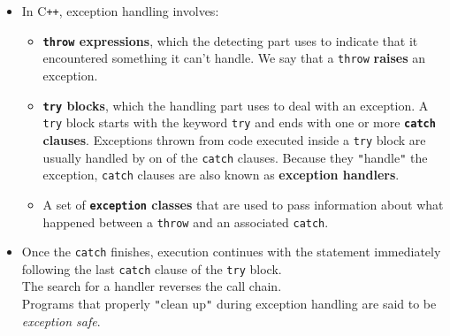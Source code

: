 \begin{itemize}
\item
In C\texttt{++}, exception handling involves:
\begin{itemize}
\item \textbf{\texttt{throw} expressions}, which the detecting part uses to indicate that it encountered something it can't handle. We say that a \texttt{throw} \textbf{raises} an exception.
\item \textbf{\texttt{try} blocks}, which the handling part uses to deal with an exception. A \texttt{try} block starts with the keyword \texttt{try} and ends with one or more \textbf{\texttt{catch} clauses}. Exceptions thrown from code executed inside a \texttt{try} block are usually handled by on of the \texttt{catch} clauses. Because they \texttt{"}handle\texttt{"} the exception, \texttt{catch} clauses are also known as \textbf{exception handlers}.
\item A set of \textbf{\texttt{exception} classes} that are used to pass information about what happened between a \texttt{throw} and an associated \texttt{catch}.
\end{itemize}

\item
Once the \texttt{catch} finishes, execution continues with the statement immediately following the last \texttt{catch} clause of the \texttt{try} block.\\
The search for a handler reverses the call chain.\\
Programs that properly \texttt{"}clean up\texttt{"} during exception handling are said to be \textit{exception safe}.

\end{itemize}